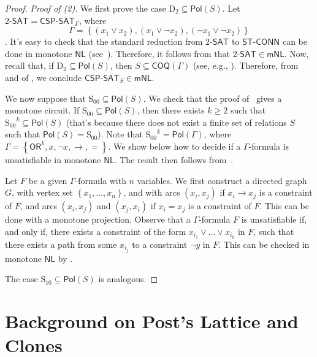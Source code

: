 \documentclass[10pt,a4paper]{article}
\newcommand{\complexityfont}[1]{\mathsf{#1}}
\newcommand{\monclass}[1]{\mathsf{m}#1}
\newcommand\NL           {\complexityfont{NL}}
\def\mNL          {\monclass{\NL}}
\def\OR           {\complexityfont{OR}}
\def\sseq{\subseteq}
\newcommand{\set}[1]{\left\{#1\right\}}
\newcommand{\stconn}{\mathsf{ST\text{-}CONN}}
\newcommand{\dSAT}{2\text{-}\mathsf{SAT}}
\newcommand{\CSPf}[1]{\mathsf{CSP}\text{-}\mathsf{SAT}_{#1}}
\newcommand{\COQ}{\mathsf{COQ}}
\newcommand{\Pol}{\mathsf{Pol}}
\newcommand{\clonefont}[1]{\mathrm{#1}}
\begin{document}
\begin{proof}
    \emph{Proof of (2)}.
    We first prove the case $\clonefont{D_2} \sseq \Pol(S)$.
    Let $\dSAT = \CSPf{\Gamma}$,
    where \[\Gamma = \set{(x_1 \lor x_2), (x_1 \lor \neg x_2), (\neg x_1 \lor
    \neg x_2)}\].
    It's easy to check that the standard reduction from
    $\dSAT$ to $\stconn$ can be done in monotone $\NL$
    (see~\cite[Theorem 4]{DBLP:journals/mst/JonesLL76}).
    Therefore, it follows from 
    that
    $\dSAT \in \mNL$.
    Now, recall that, if
    $\clonefont{D_2} \sseq \Pol(S)$, then
    $S \sseq \COQ(\Gamma)$
    (see, e.g., \cite[Lemma 4.9]{DBLP:books/daglib/0004131}).
    Therefore,
    from  and
     of ,
    we conclude
    $\CSPf{S} \in \mNL$.

    We now suppose that $\clonefont{S_{00}} \sseq \Pol(S)$.
    We check that the proof of~\cite[Lemma 3.4]{DBLP:journals/jcss/AllenderBISV09}
    gives a monotone circuit.
    If $\clonefont{S_{00}} \sseq \Pol(S)$, then
    there exists $k \geq 2$ such that
    $\clonefont{S_{00}}^k \sseq \Pol(S)$
    (that's because there does not exist a finite set of relations
    $S$ such that $\Pol(S) = \clonefont{S_{00}}$).
    Note that
    $\clonefont{S_{00}}^k = \Pol(\Gamma)$,
    where $\Gamma = \set{\OR^k, x, \neg x, \to, =}$.
    We show below how to decide if a $\Gamma$-formula is unsatisfiable 
    in monotone $\NL$.
    The result then follows from~.

    Let $F$ be a given $\Gamma$-formula with $n$ variables.
    We first construct a directed graph $G$,
    with vertex set $\set{x_1,\dots,x_n}$,
    and with arcs 
    $(x_i,x_j)$
    if $x_i \to x_j$ is a constraint of $F$,
    and 
    arcs
    $(x_i,x_j)$
    and
    $(x_j,x_i)$
    if
    $x_i = x_j$ is a constraint of $F$.
    This can be done with a monotone projection.
    Observe that a $\Gamma$-formula $F$
    is unsatisfiable if, and only if,
    there exists a constraint of the form $x_{i_1} \lor \dots \lor x_{i_k}$ in $F$,
    such that there exists a path from some $x_{i_j}$ to a constraint
    $\neg y$ in $F$.
    This can be checked in monotone $\NL$ by .

    The case $\clonefont{S_{10}} \sseq \Pol(S)$ is analogous.
\end{proof}



\section{Background on Post's Lattice and Clones}
\label{sec:clone-background}
\end{document}
